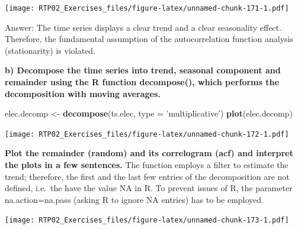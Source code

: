 \documentclass[
]{article}
\newenvironment{Shaded}{\begin{snugshade}}{\end{snugshade}}
\newcommand{\DataTypeTok}[1]{\textcolor[rgb]{0.13,0.29,0.53}{#1}}
\newcommand{\DecValTok}[1]{\textcolor[rgb]{0.00,0.00,0.81}{#1}}
\newcommand{\KeywordTok}[1]{\textcolor[rgb]{0.13,0.29,0.53}{\textbf{#1}}}
\newcommand{\NormalTok}[1]{#1}
\newcommand{\OperatorTok}[1]{\textcolor[rgb]{0.81,0.36,0.00}{\textbf{#1}}}
\newcommand{\StringTok}[1]{\textcolor[rgb]{0.31,0.60,0.02}{#1}}
\begin{document}
\texttt{[image: RTP02\_Exercises\_files/figure-latex/unnamed-chunk-171-1.pdf]}

Answer: The time series displays a clear trend and a clear seasonality
effect. Therefore, the fundamental assumption of the autocorrelation
function analysis (stationarity) is violated.

\textbf{b) Decompose the time series into trend, seasonal component and
remainder using the R function decompose(), which performs the
decomposition with moving averages.}

\begin{Shaded}
\begin{Highlighting}[]
\NormalTok{elec.decomp <-}\StringTok{ }\KeywordTok{decompose}\NormalTok{(ts.elec, }\DataTypeTok{type =} \StringTok{'multiplicative'}\NormalTok{)}
\KeywordTok{plot}\NormalTok{(elec.decomp)}
\end{Highlighting}
\end{Shaded}

\texttt{[image: RTP02\_Exercises\_files/figure-latex/unnamed-chunk-172-1.pdf]}

\textbf{Plot the remainder (random) and its correlogram (acf) and
interpret the plots in a few sentences.} The function employs a filter
to estimate the trend; therefore, the first and the last few entries of
the decomposition are not defined, i.e.~the have the value NA in R. To
prevent issues of R, the parameter na.action=na.pass (asking R to ignore
NA entries) has to be employed.

\begin{Shaded}
\end{Shaded}

\texttt{[image: RTP02\_Exercises\_files/figure-latex/unnamed-chunk-173-1.pdf]}

\begin{Shaded}
\end{Shaded}
\end{document}
